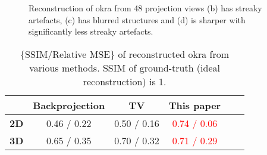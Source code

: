\documentclass[journal]{IEEEtran}
\begin{document}
\begin{figure}[!h]
\centering
{}
{}
\caption{Reconstruction of okra from 48 projection views
   (b) has streaky artefacts, (c) has blurred structures and (d) is sharper with significantly less streaky artefacts.}
\label{fig:okra_2D_results}
\end{figure}

\begin{comment}
\begin{figure}[!h]
\centering
\subcaptionbox{Test}{\fcolorbox{cyan}{cyan}{\texttt{[image: ../images/okra/post\_TCI/2D/48\_views/test\_zoomed.png]}}}
\subcaptionbox{FDK, no prior}{\texttt{[image: ../images/okra/post\_TCI/2D/48\_views/fbp\_zoomed.png]}}
\subcaptionbox{TV, no prior}{\texttt{[image: ../images/okra/post\_TCI/2D/48\_views/tv\_zoomed.png]}}
\subcaptionbox{This paper}{\texttt{[image: ../images/okra/post\_TCI/2D/48\_views/weighted\_pca\_zoomed.png]}}
\caption{A zoomed-in version of the regions around the RoI of the reconstructions shown in Fig.~\ref{fig:okra_2D_results}. }
\label{fig:okra_zoomed_2D_results}
\end{figure}
\end{comment}

\begin{table}[!h]
  \centering
  \caption{\{SSIM/Relative MSE\} of reconstructed okra from various
    methods. SSIM of ground-truth (ideal reconstruction) is 1.}
\begin{tabular}{|l|c|c|c|c|c|}
\hline &
\textbf{Backprojection} & \textbf{TV} &
\textbf{This paper} \\ \hline \textbf{2D} & 0.46 / 0.22
& 0.50 / 0.16 & \textcolor{red}{0.74 / 0.06} \\ \hline \textbf{3D} & 0.65 / 0.35 & 0.70 / 0.32 & \textcolor{red}{0.71 / 0.29}
\\ \hline
\end{tabular}
\label{table:okra_ssim}
\end{table}
\end{document}

